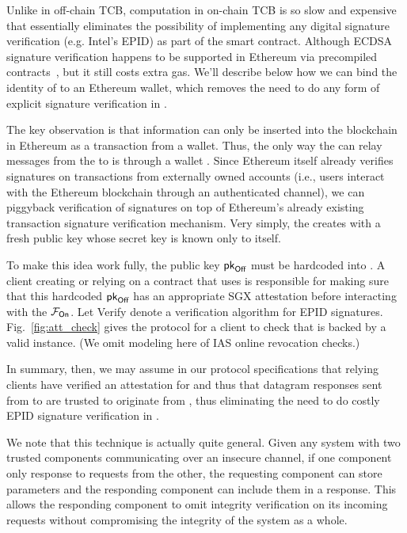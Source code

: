 Unlike in off-chain TCB, computation in on-chain TCB is so slow and expensive that 
essentially eliminates the possibility of implementing any digital signature
verification (e.g. Intel's EPID) as part of the smart contract.
Although ECDSA signature verification happens to be supported in Ethereum via
precompiled contracts~\cite{ethereum}, but it still costs extra gas.
We'll describe below how we can bind the identity of \tcboff 
to an Ethereum wallet, which removes
the need to do any form of explicit signature verification in \tcbon.

The key observation is that information can only be inserted into the blockchain
in Ethereum as a transaction from a wallet.  Thus, the only way the \medname can
relay messages from the \tcboff to \tcbon is through a wallet \tcadd.  
Since Ethereum itself already verifies
signatures on transactions from externally owned accounts (i.e., users interact
with the Ethereum blockchain through an authenticated channel), we can 
piggyback verification of \tcboff signatures on top of Ethereum's
already existing transaction signature verification mechanism.  Very simply,
the \tcboff creates \tcadd with a fresh public key \pkoff whose
secret key is known only to \tcboff itself. 

To make this idea work fully, the public key $\textsf{pk}_{\textsf{Off}}$ must be hardcoded into
\tcbon. A client creating or relying on a contract that uses \tcbon is
responsible for making sure that this hardcoded $\textsf{pk}_{\textsf{Off}}$ has an appropriate SGX
attestation before interacting with the $\mathcal{F}_{\textsf{On}}$.  Let {\sf
Verify} denote a verification algorithm for EPID signatures.
Fig.~\ref{fig:att_check} gives the protocol for a client to check that \tcbon is
backed by a valid \tcboff instance. (We omit modeling here of IAS online
revocation checks.)

In summary, then, we may assume in our protocol specifications that relying
clients have verified an attestation for \tcboff and thus that datagram
responses sent from \tcadd to \tcbon are trusted to originate from \tcboff,
thus eliminating the need to do costly EPID signature verification in \tcbon.

We note that this technique is actually quite general.  Given any system with
two trusted components communicating over an insecure channel, if one component
only response to requests from the other, the requesting component can store
parameters and the responding component can include them in a response.  This
allows the responding component to omit integrity verification on its incoming
requests without compromising the integrity of the system as a whole.


